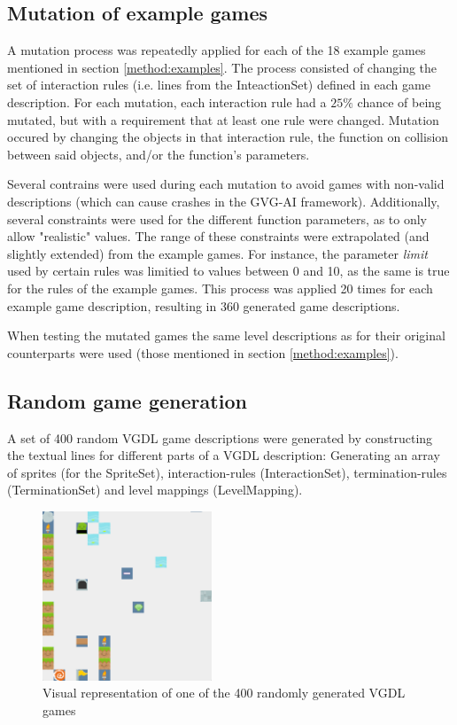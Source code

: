 \documentclass{llncs}
\begin{document}
\subsection{Mutation of example games}
\label{method:mutation}
A mutation process was repeatedly applied for each of the 18 example games mentioned in section \ref{method:examples}. 
The process consisted of changing the set of interaction rules (i.e. lines from the InteactionSet) defined in each game description.
For each mutation, each interaction rule had a $25\%$ chance of being mutated, but with a requirement that at least one rule were changed. 
Mutation occured by changing the objects in that interaction rule, the function on collision between said objects, and/or the function's parameters.

Several contrains were used during each mutation to avoid games with non-valid descriptions (which can cause crashes in the GVG-AI framework).
Additionally, several constraints were used for the different function parameters, as to only allow "realistic" values. 
The range of these constraints were extrapolated (and slightly extended) from the example games. 
For instance, the parameter \emph{limit} used by certain rules was limitied to values between 0 and 10, as the same is true for the rules of the example games. 
This process was applied 20 times for each example game description, resulting in 360 generated game descriptions.

When testing the mutated games the same level descriptions as for their original counterparts were used (those mentioned in section \ref{method:examples}).




\subsection{Random game generation}
\label{method:random}

A set of 400 random VGDL game descriptions were generated by constructing the textual lines for different parts of a VGDL description: Generating an array of sprites (for the SpriteSet), interaction-rules (InteractionSet), termination-rules (TerminationSet) and level mappings (LevelMapping).


\begin{figure}[ht]
	\centering
	\includegraphics[width=0.45\textwidth]{gengame.png}
	\caption{Visual representation of one of the 400 randomly generated VGDL games}
\end{figure}
\end{document}
